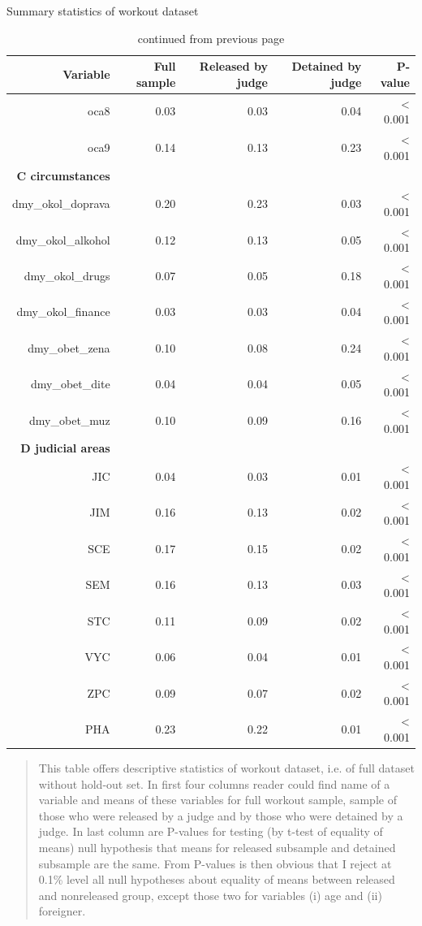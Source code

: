\documentclass[12pt, twoside,openany]{book} %
\begin{document}
\begin{table}[H]
 \caption{Summary statistics of workout dataset}
\medskip
{\small {}}

\end{table}



\begin{table}[H]
\centering
\begin{tabular}{rrrrr}
  \hline
 Variable & Full sample & Released by judge & Detained by judge & P-value \\ 
  \hline
  oca8 & 0.03 & 0.03 & 0.04 & < 0.001 \\ 
  oca9 & 0.14 & 0.13 & 0.23 & < 0.001 \\ 
  \textbf{C circumstances}&&&&\\
  dmy\_okol\_doprava & 0.20 & 0.23 & 0.03 & < 0.001 \\ 
  dmy\_okol\_alkohol & 0.12 & 0.13 & 0.05 & < 0.001 \\ 
  dmy\_okol\_drugs & 0.07 & 0.05 & 0.18 & < 0.001 \\ 
  dmy\_okol\_finance & 0.03 & 0.03 & 0.04 & < 0.001 \\ 
  dmy\_obet\_zena & 0.10 & 0.08 & 0.24 & < 0.001 \\ 
  dmy\_obet\_dite & 0.04 & 0.04 & 0.05 & < 0.001 \\ 
  dmy\_obet\_muz & 0.10 & 0.09 & 0.16 & < 0.001 \\ 
  \textbf{D judicial areas}&&&&\\
  JIC & 0.04 & 0.03 & 0.01 & < 0.001 \\ 
  JIM & 0.16 & 0.13 & 0.02 & < 0.001 \\ 
  SCE & 0.17 & 0.15 & 0.02 & < 0.001 \\ 
  SEM & 0.16 & 0.13 & 0.03 & < 0.001 \\ 
  STC & 0.11 & 0.09 & 0.02 & < 0.001 \\ 
  VYC & 0.06 & 0.04 & 0.01 & < 0.001 \\ 
  ZPC & 0.09 & 0.07 & 0.02 & < 0.001 \\ 
  PHA & 0.23 & 0.22 & 0.01 & < 0.001 \\ 
   \hline
\end{tabular}

\renewcommand\thetable{2.3}
 \caption{continued from previous page}
\medskip
{\small 
\begin{quotation}
This table offers descriptive statistics of workout dataset, i.e. of full dataset without hold-out set. In first four columns reader could find name of a variable and means of these variables for full workout sample, sample of those who were released by a judge and by those who were detained by a judge. In last column are P-values for testing (by t-test of equality of means) null hypothesis that means for released subsample and detained subsample are the same. From P-values is then obvious that I reject at 0.1\% level all null hypotheses about equality of means between released and nonreleased group, except those two for variables (i) age and (ii) foreigner.
\end{quotation}
}

\end{table}
\end{document}
